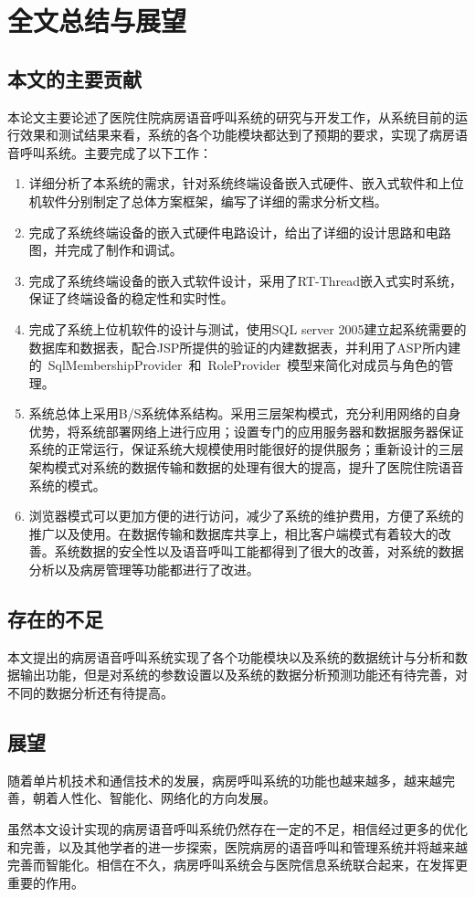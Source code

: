 
\chapter{全文总结与展望}
\section{本文的主要贡献}
本论文主要论述了医院住院病房语音呼叫系统的研究与开发工作，从系统目前的运行效果和测试结果来看，系统的各个功能模块都达到了预期的要求，实现了病房语音呼叫系统。主要完成了以下工作：
\begin{enumerate}
\item 详细分析了本系统的需求，针对系统终端设备嵌入式硬件、嵌入式软件和上位机软件分别制定了总体方案框架，编写了详细的需求分析文档。
\item 完成了系统终端设备的嵌入式硬件电路设计，给出了详细的设计思路和电路图，并完成了制作和调试。
\item 完成了系统终端设备的嵌入式软件设计，采用了RT-Thread嵌入式实时系统，保证了终端设备的稳定性和实时性。
\item 完成了系统上位机软件的设计与测试，使用SQL server 2005建立起系统需要的数据库和数据表，配合JSP所提供的验证的内建数据表，并利用了ASP所内建的~SqlMembershipProvider~和~RoleProvider~模型来简化对成员与角色的管理。
\item 系统总体上采用B/S系统体系结构。采用三层架构模式，充分利用网络的自身优势，将系统部署网络上进行应用；设置专门的应用服务器和数据服务器保证系统的正常运行，保证系统大规模使用时能很好的提供服务；重新设计的三层架构模式对系统的数据传输和数据的处理有很大的提高，提升了医院住院语音系统的模式。
\item 浏览器模式可以更加方便的进行访问，减少了系统的维护费用，方便了系统的推广以及使用。在数据传输和数据库共享上，相比客户端模式有着较大的改善。系统数据的安全性以及语音呼叫工能都得到了很大的改善，对系统的数据分析以及病房管理等功能都进行了改进。 
\end{enumerate}

\section{存在的不足}
本文提出的病房语音呼叫系统实现了各个功能模块以及系统的数据统计与分析和数据输出功能，但是对系统的参数设置以及系统的数据分析预测功能还有待完善，对不同的数据分析还有待提高。

\section{展望}
随着单片机技术和通信技术的发展，病房呼叫系统的功能也越来越多，越来越完善，朝着人性化、智能化、网络化的方向发展。

虽然本文设计实现的病房语音呼叫系统仍然存在一定的不足，相信经过更多的优化和完善，以及其他学者的进一步探索，医院病房的语音呼叫和管理系统并将越来越完善而智能化。相信在不久，病房呼叫系统会与医院信息系统联合起来，在发挥更重要的作用。